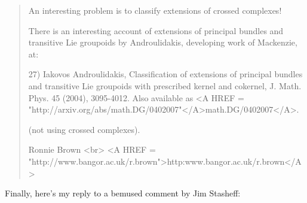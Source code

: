 \begin{quote}
 An interesting problem is to classify extensions of crossed complexes!

 There is an interesting account of extensions of principal bundles and
 transitive Lie groupoids by Androulidakis, developing work of Mackenzie,
 at:

 27) Iakovos Androulidakis, Classification of extensions of principal 
 bundles and transitive Lie groupoids with prescribed kernel and 
 cokernel, J. Math. Phys. 45 (2004), 3095-4012.  Also available as
 <A HREF = "http://arxiv.org/abs/math.DG/0402007"</A>math.DG/0402007</A>. 

 (not using crossed complexes).

 Ronnie Brown <br>
 <A HREF = "http://www.bangor.ac.uk/r.brown">http:www.bangor.ac.uk/r.brown</A> 
\end{quote}

Finally, here's my reply to a bemused comment by Jim Stasheff:

